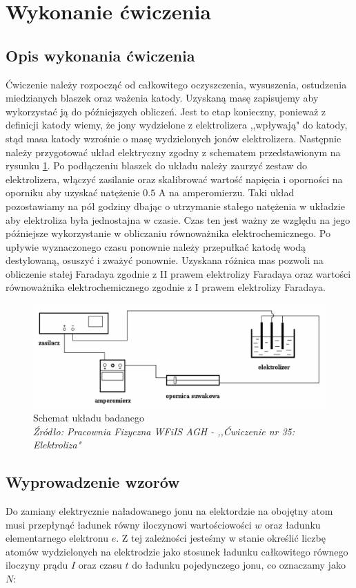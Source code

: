 \documentclass[a4paper,12pts]{article}
\begin{document}
	\section{Wykonanie ćwiczenia}
	\subsection{Opis wykonania ćwiczenia}
	Ćwiczenie należy rozpocząć od całkowitego oczyszczenia, wysuszenia, ostudzenia miedzianych blaszek oraz ważenia katody. Uzyskaną masę zapisujemy aby wykorzystać ją do późniejszych obliczeń. Jest to etap konieczny, ponieważ z definicji katody wiemy, że jony wydzielone z elektrolizera ,,wpływają" do katody, stąd masa katody wzrośnie o masę wydzielonych jonów elektrolizera. Następnie należy przygotować układ elektryczny zgodny z schematem przedstawionym na rysunku \ref{schemat_ukladu}. Po podłączeniu blaszek do układu należy zaurzyć zestaw do elektrolizera, włączyć zasilanie oraz skalibrować wartość napięcia i oporności na oporniku aby uzyskać natężenie $0.5$ A na amperomierzu. Taki układ pozostawiamy na pół godziny dbając o utrzymanie stałego natężenia w układzie aby elektroliza była jednostajna w czasie. Czas ten jest ważny ze względu na jego późniejsze wykorzystanie w obliczaniu równoważnika elektrochemicznego. Po upływie wyznaczonego czasu ponownie należy przepułkać katodę wodą destylowaną, osuszyć i zważyć ponownie. Uzyskana różnica mas pozwoli na obliczenie stałej Faradaya zgodnie z II prawem elektrolizy Faradaya oraz wartości równoważnika elektrochemicznego zgodnie z I prawem elektrolizy Faradaya.

	
	\begin{figure}[!h]
		\centering
		\includegraphics[scale=0.6]{schemat.png}
		\caption{Schemat układu badanego \\ \textit{Źródło: Pracownia Fizyczna WFiIS AGH - ,,Ćwiczenie nr 35: Elektroliza"}}
		\label{schemat_ukladu}
	\end{figure}

	\subsection{Wyprowadzenie wzorów}
	Do zamiany elektrycznie naładowanego jonu na elektordzie na obojętny atom musi przepłynąć ładunek równy iloczynowi wartościowości $w$ oraz ładunku elementarnego elektronu $e$. Z tej zależności jesteśmy w stanie określić liczbę atomów wydzielonych na elektrodzie jako stosunek ładunku całkowitego równego iloczyny prądu $I$ oraz czasu $t$ do ładunku pojedynczego jonu, co oznaczamy jako $N$:
	
\end{document}
